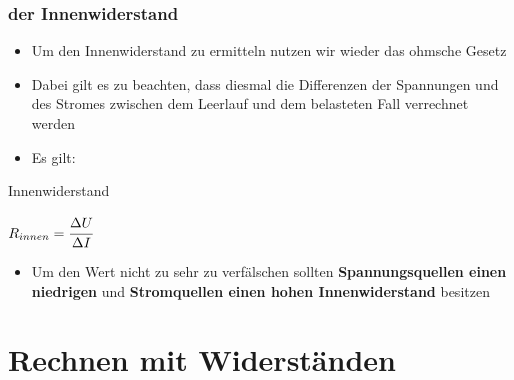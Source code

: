 \begin{frame}
  \frametitle{der Innenwiderstand}
  \begin{itemize}
    \item Um den Innenwiderstand zu ermitteln nutzen wir wieder das ohmsche Gesetz
    \item Dabei gilt es zu beachten, dass diesmal die Differenzen der Spannungen und des Stromes zwischen dem Leerlauf und dem belasteten Fall verrechnet werden
    \item Es gilt:
  \end{itemize}
  \begin{block}{Innenwiderstand}
    \begin{center}
      $R_{innen} = \cfrac{\Delta U}{\Delta I}$
    \end{center}
  \end{block}
  \begin{itemize}
    \item Um den Wert nicht zu sehr zu verfälschen sollten \textbf{Spannungsquellen einen niedrigen} und \textbf{Stromquellen einen hohen Innenwiderstand} besitzen
  \end{itemize}
\end{frame}


\section{Rechnen mit Widerständen}

